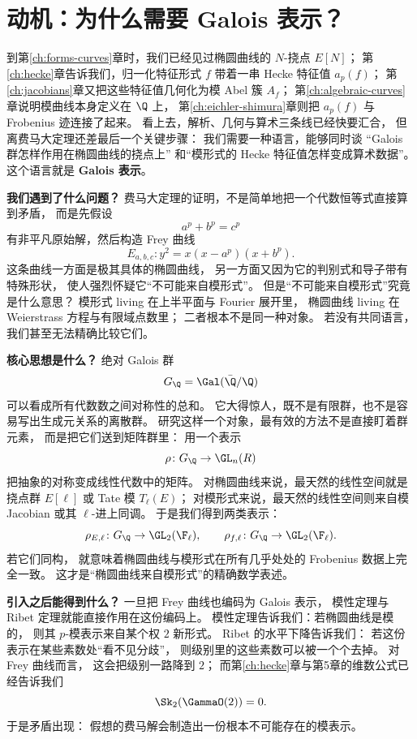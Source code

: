 \section{动机：为什么需要 Galois 表示？}
\label{sec:ch09-motivation}

\providecommand{\Zl}{\mathbb{Z}_\ell}
\providecommand{\Ql}{\mathbb{Q}_\ell}
\providecommand{\rhobar}{\bar{\rho}}

到第\ref{ch:forms-curves}章时，我们已经见过椭圆曲线的 $N$-挠点 $E[N]$；
第\ref{ch:hecke}章告诉我们，归一化特征形式 $f$ 带着一串 Hecke 特征值 $a_p(f)$；
第\ref{ch:jacobians}章又把这些特征值几何化为模 Abel 簇 $A_f$；
第\ref{ch:algebraic-curves}章说明模曲线本身定义在 $\Q$ 上，
第\ref{ch:eichler-shimura}章则把 $a_p(f)$ 与 Frobenius 迹连接了起来。
看上去，解析、几何与算术三条线已经快要汇合，
但离费马大定理还差最后一个关键步骤：
我们需要一种语言，能够同时谈
“Galois 群怎样作用在椭圆曲线的挠点上”
和“模形式的 Hecke 特征值怎样变成算术数据”。
这个语言就是 \textbf{Galois 表示}。

\textbf{我们遇到了什么问题？}
费马大定理的证明，不是简单地把一个代数恒等式直接算到矛盾，
而是先假设
\[
  a^p+b^p=c^p
\]
有非平凡原始解，然后构造 Frey 曲线
\[
  E_{a,b,c}\colon y^2=x(x-a^p)(x+b^p).
\]
这条曲线一方面是极其具体的椭圆曲线，
另一方面又因为它的判别式和导子带有特殊形状，
使人强烈怀疑它“不可能来自模形式”。
但是“不可能来自模形式”究竟是什么意思？
模形式 living 在上半平面与 Fourier 展开里，
椭圆曲线 living 在 Weierstrass 方程与有限域点数里；
二者根本不是同一种对象。
若没有共同语言，
我们甚至无法精确比较它们。

\textbf{核心思想是什么？}
绝对 Galois 群
\[
  G_\Q=\Gal(\bar\Q/\Q)
\]
可以看成所有代数数之间对称性的总和。
它大得惊人，既不是有限群，也不是容易写出生成元关系的离散群。
研究这样一个对象，最有效的方法不是直接盯着群元素，
而是把它们送到矩阵群里：
用一个表示
\[
  \rho\colon G_\Q\to \GL_n(R)
\]
把抽象的对称变成线性代数中的矩阵。
对椭圆曲线来说，最天然的线性空间就是挠点群 $E[\ell]$ 或 Tate 模 $T_\ell(E)$；
对模形式来说，最天然的线性空间则来自模 Jacobian 或其 $\ell$-进上同调。
于是我们得到两类表示：
\[
  \rho_{E,\ell}\colon G_\Q\to \GL_2(\F_\ell),
  \qquad
  \rho_{f,\ell}\colon G_\Q\to \GL_2(\F_\ell).
\]
若它们同构，
就意味着椭圆曲线与模形式在所有几乎处处的 Frobenius 数据上完全一致。
这才是“椭圆曲线来自模形式”的精确数学表述。

\textbf{引入之后能得到什么？}
一旦把 Frey 曲线也编码为 Galois 表示，
模性定理与 Ribet 定理就能直接作用在这份编码上。
模性定理告诉我们：若椭圆曲线是模的，
则其 $p$-模表示来自某个权 $2$ 新形式。
Ribet 的水平下降告诉我们：
若这份表示在某些素数处“看不见分歧”，
则级别里的这些素数可以被一个个去掉。
对 Frey 曲线而言，
这会把级别一路降到 $2$；
而第\ref{ch:hecke}章与第5章的维数公式已经告诉我们
\[
  \Sk_2(\GammaO(2))=0.
\]
于是矛盾出现：
假想的费马解会制造出一份根本不可能存在的模表示。

